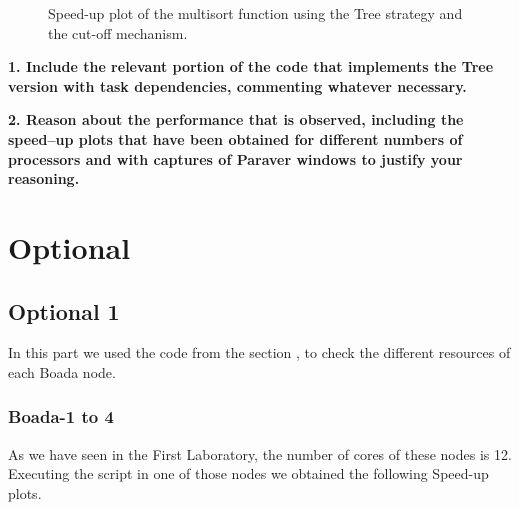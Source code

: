\documentclass[12pt, a4paper]{article}
\begin{document}
\begin{figure}[H]
\begin{minipage}[b]{0.4\linewidth}
  \caption{Speed-up plot of the multisort function using the Tree strategy and the cut-off mechanism.}
  \label{fig:mandel-omp-10000-strong-21-speedup}
\end{minipage}
\end{figure}

\break

\textbf{1. Include the relevant portion of the code that implements the Tree version with task dependencies,
commenting whatever necessary.}

\textbf{2. Reason about the performance that is observed, including the speed–up plots that have been
obtained for different numbers of processors and with captures of Paraver windows to justify your
reasoning.}

\section{Optional}

\subsection{Optional 1}

In this part we used the code from the section , to check the different resources of each Boada node.

\subsubsection{Boada-1 to 4}

As we have seen in the First Laboratory, the number of cores of these nodes is 12. Executing the script in one of those nodes we obtained the following Speed-up plots.
\end{document}
